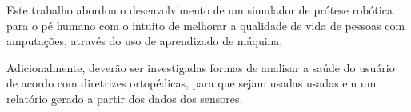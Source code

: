 Este trabalho abordou o desenvolvimento de um simulador de prótese robótica para o pé humano com o intuito de melhorar a qualidade de vida de pessoas com amputações, através do uso de aprendizado de máquina.

% 

% 
Adicionalmente, deverão ser investigadas formas de analisar a saúde do usuário de acordo com diretrizes ortopédicas, para que sejam usadas usadas em um relatório gerado a partir dos dados dos sensores.